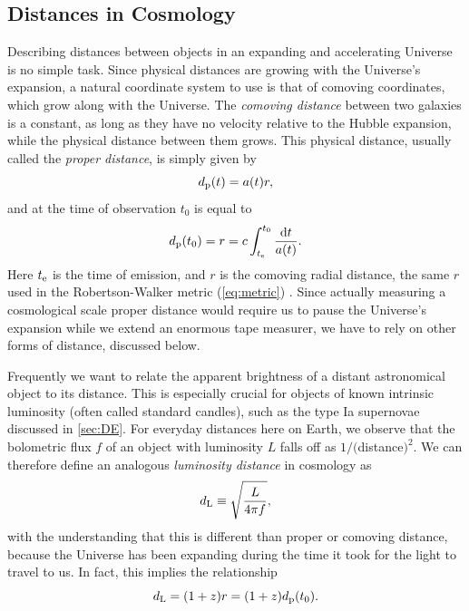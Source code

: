 
\subsection{Distances in Cosmology}
\label{sec:distances}

Describing distances between objects in an expanding and accelerating Universe is no simple task. Since physical distances are growing with the Universe's expansion, a natural coordinate system to use is that of comoving coordinates, which grow along with the Universe. The {\it comoving distance} between two galaxies is a constant, as long as they have no velocity relative to the Hubble expansion, while the physical distance between them grows. This physical distance, usually called the {\it proper distance}, is simply given by
\begin{equation}
d_{\rm p}(t) = a(t) r,
\end{equation}
and at the time of observation $t_0$ is equal to
\begin{equation}
d_{\rm p}(t_0) = r = c \int_{t_{\rm e}}^{t_0} \frac{{\rm d}t}{a(t)}.
\end{equation}
Here $t_{\rm e}$ is the time of emission, and $r$ is the comoving radial distance, the same $r$ used in the Robertson-Walker metric (\autoref{eq:metric}) \citep{Hogg99}. Since actually measuring a cosmological scale proper distance would require us to pause the Universe's expansion while we extend an enormous tape measurer, we have to rely on other forms of distance, discussed below. 

Frequently we want to relate the apparent brightness of a distant astronomical object to its distance. This is especially crucial for objects of known intrinsic luminosity (often called standard candles), such as the type Ia supernovae discussed in \autoref{sec:DE}. For everyday distances here on Earth, we observe that the bolometric flux $f$ of an object with luminosity $L$ falls off as $1/($distance$)^2$. We can therefore define an analogous {\it luminosity distance} in cosmology as
\begin{equation}
\label{eqn:dL}
d_{\rm L} \equiv \sqrt{\frac{L}{4\pi f}},
\end{equation}
with the understanding that this is different than proper or comoving distance, because the Universe has been expanding during the time it took for the light to travel to us. In fact, this implies the relationship
\begin{equation}
d_{\rm L} = (1+z)r = (1+z)d_{\rm p}(t_0).
\end{equation}

